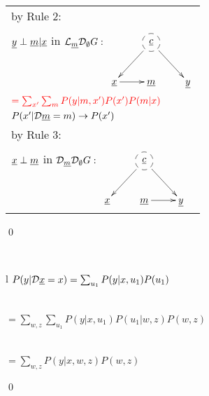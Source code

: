 \begin{longtable}{l}
\quad by Rule 2:
\begin{tabular}{l}
\\
\end{tabular}
\\
\quad
${\underline{y}}\perp{\underline{m}}|{\underline{x}}$ in
${\cal L}_{\underline{m}} {\cal D}_\emptyset G:$
$\xymatrix{
&*++[F-o]{\rvc}\ar[rd]\ar[ld]
\\
\rvx\ar[r]
&\rvm
&\rvy
}$
\\
$\color{red}=
\sum_{x'}
\sum_m
P(y|m, x')
P(x')
P(m|x)$
\\
\quad $P(x'|{\cal D}{\underline{m}}=m)
\rightarrow
P(x')$
\\
\quad by Rule 3:
\begin{tabular}{l}
\\
\end{tabular}
\\
\quad
${\underline{x}}\perp{\underline{m}}$ in
${\cal D}_{\underline{m}} {\cal D}_\emptyset G:$
$\xymatrix{
&*++[F-o]{\rvc}\ar[rd]\ar[ld]
\\
\rvx
&\rvm\ar[r]
&\rvy
}$
\end{longtable}
\qed



\begin{claim}
\label{cl-decNapkin}
\decNapkin
\end{claim}
\proof
\\
\begin{longtable}{l}
\color{red}
$P(y|{\cal D}{\underline{x}}=x)=
\sum_{u_1}P(y|x, u_1)P(u_1)$
\\
\\
\xymatrix{\\=}
\quad
{}
\\
\color{red}
$
=\sum_{w,z}\sum_{u_1}P(y|x, u_1)P(u_1|w,z)
P(w,z)$
\\
\\
\xymatrix{\\=}
\\
\color{red}
$
=\sum_{w,z}P(y|x,w,z)
P(w,z)$
\\
\xymatrix{
\\=}
\end{longtable}
\qed



